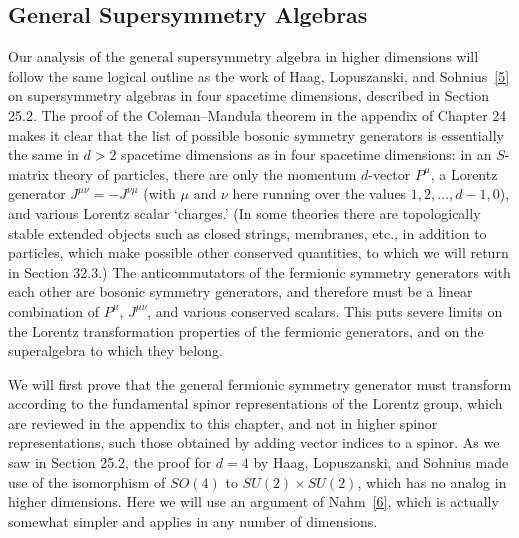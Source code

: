 
\subsection{General Supersymmetry Algebras}

Our analysis of the general supersymmetry algebra in higher dimensions will
follow the same logical outline as the work of Haag, Lopuszanski, and
Sohnius~\hyperref[ch32-ref-5]{[5]} on supersymmetry algebras in four
spacetime dimensions, described in Section 25.2. The proof of the
Coleman--Mandula theorem in the appendix of Chapter 24 makes it clear that
the list of possible bosonic symmetry generators is essentially the same in
\(d>2\) spacetime dimensions as in four spacetime dimensions: in an
\(S\)-matrix theory of particles, there are only the momentum \(d\)-vector
\(P^\mu\), a Lorentz generator \(J^{\mu\nu}=-J^{\nu\mu}\) (with \(\mu\)
and \(\nu\) here running over the values \(1,2,\ldots,d-1,0\)), and various
Lorentz scalar `charges.' (In some theories there are topologically stable
extended objects such as closed strings, membranes, etc., in addition to
particles, which make possible other conserved quantities, to which we will
return in Section 32.3.) The anticommutators of the fermionic symmetry
generators with each other are bosonic symmetry generators, and therefore
must be a linear combination of \(P^\mu\), \(J^{\mu\nu}\), and various
conserved scalars. This puts severe limits on the Lorentz transformation
properties of the fermionic generators, and on the superalgebra to which
they belong.

We will first prove that the general fermionic symmetry generator must
transform according to the fundamental spinor representations of the
Lorentz group, which are reviewed in the appendix to this chapter, and not
in higher spinor representations, such those obtained by adding vector
indices to a spinor. As we saw in Section 25.2, the proof for \(d=4\) by
Haag, Lopuszanski, and Sohnius made use of the isomorphism of \(SO(4)\) to
\(SU(2)\times SU(2)\), which has no analog in higher dimensions.
Here we will use an argument of Nahm~\hyperref[ch32-ref-6]{[6]}, which is
actually somewhat simpler and applies in any number of dimensions.

